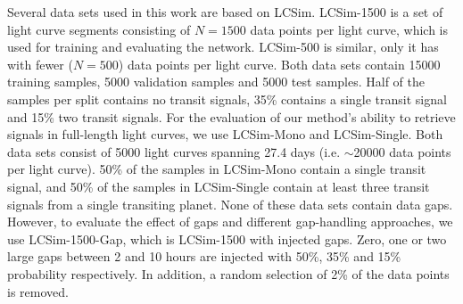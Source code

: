 Several data sets used in this work are based on LCSim. LCSim-1500 is a set of light curve segments consisting of $N=1500$ data points per light curve, which is used for training and evaluating the network. LCSim-500 is similar, only it has with fewer ($N=500$) data points per light curve. Both data sets contain 15000 training samples, 5000 validation samples and 5000 test samples. Half of the samples per split contains no transit signals, 35\% contains a single transit signal and 15\% two transit signals. For the evaluation of our method's ability to retrieve signals in full-length light curves, we use LCSim-Mono and LCSim-Single. Both data sets consist of 5000 light curves spanning 27.4 days (i.e. $\sim$20000 data points per light curve). 50\% of the samples in LCSim-Mono contain a single transit signal, and 50\% of the samples in LCSim-Single contain at least three transit signals from a single transiting planet. None of these data sets contain data gaps. However, to evaluate the effect of gaps and different gap-handling approaches, we use LCSim-1500-Gap, which is LCSim-1500 with injected gaps. Zero, one or two large gaps between 2 and 10 hours are injected with 50\%, 35\% and 15\% probability respectively. In addition, a random selection of 2\% of the data points is removed.




